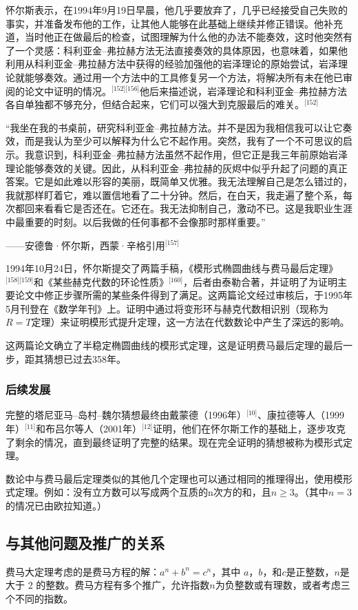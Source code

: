 怀尔斯表示，在1994年9月19日早晨，他几乎要放弃了，几乎已经接受自己失败的事实，并准备发布他的工作，让其他人能够在此基础上继续并修正错误。他补充道，当时他正在做最后的检查，试图理解为什么他的办法不能奏效，这时他突然有了一个灵感：科利亚金–弗拉赫方法无法直接奏效的具体原因，也意味着，如果他利用从科利亚金–弗拉赫方法中获得的经验加强他的岩泽理论的原始尝试，岩泽理论就能够奏效。通过用一个方法中的工具修复另一个方法，将解决所有未在他已审阅的论文中证明的情况。\(^\text{[152][156]}\)他后来描述说，岩泽理论和科利亚金–弗拉赫方法各自单独都不够充分，但结合起来，它们可以强大到克服最后的难关。\(^\text{[152]}\)

“我坐在我的书桌前，研究科利亚金–弗拉赫方法。并不是因为我相信我可以让它奏效，而是我认为至少可以解释为什么它不起作用。突然，我有了一个不可思议的启示。我意识到，科利亚金–弗拉赫方法虽然不起作用，但它正是我三年前原始岩泽理论能够奏效的关键。因此，从科利亚金–弗拉赫的灰烬中似乎升起了问题的真正答案。它是如此难以形容的美丽，既简单又优雅。我无法理解自己是怎么错过的，我就那样盯着它，难以置信地看了二十分钟。然后，在白天，我走遍了整个系，每次都回来看看它是否还在。它还在。我无法抑制自己，激动不已。这是我职业生涯中最重要的时刻。以后我做的任何事都不会像那时那样重要。”

——安德鲁·怀尔斯，西蒙·辛格引用\(^\text{[157]}\)

1994年10月24日，怀尔斯提交了两篇手稿，《模形式椭圆曲线与费马最后定理》\(^\text{[158][159]}\)和《某些赫克代数的环论性质》\(^\text{[160]}\)，后者由泰勒合著，并证明了为证明主要论文中修正步骤所需的某些条件得到了满足。这两篇论文经过审核后，于1995年5月刊登在《数学年刊》上。证明中通过将变形环与赫克代数相识别（现称为\(R=T\)定理）来证明模形式提升定理，这一方法在代数数论中产生了深远的影响。

这两篇论文确立了半稳定椭圆曲线的模形式定理，这是证明费马最后定理的最后一步，距其猜想已过去358年。
\subsubsection{后续发展}  
完整的塔尼亚马–岛村–魏尔猜想最终由戴蒙德（1996年）\(^\text{[10]}\)、康拉德等人（1999年）\(^\text{[11]}\)和布吕尔等人（2001年）\(^\text{[12]}\)证明，他们在怀尔斯工作的基础上，逐步攻克了剩余的情况，直到最终证明了完整的结果。现在完全证明的猜想被称为模形式定理。

数论中与费马最后定理类似的其他几个定理也可以通过相同的推理得出，使用模形式定理。例如：没有立方数可以写成两个互质的n次方的和，且\( n \geq 3 \)。（其中\( n = 3 \)的情况已由欧拉知道。）
\subsection{与其他问题及推广的关系}
费马大定理考虑的是费马方程的解：\( a^n + b^n = c^n \)，其中 \( a \)，\( b \)，和\( c \)是正整数，\( n \)是大于 2 的整数。费马方程有多个推广，允许指数\( n \)为负整数或有理数，或者考虑三个不同的指数。

